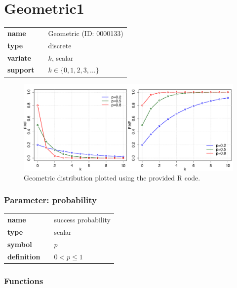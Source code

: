 \section*{Geometric1} 

  \bigskip 

\begin{tabular}{p{2cm}cl}
\textbf{name} & & Geometric (ID: 0000133)\\ 
 
\textbf{type} & & discrete \\ 

\textbf{variate} & & $k
$, scalar \\ 

\textbf{support} & & $k \in \{0,1,2,3,\dots\}$
\end{tabular}

\begin{figure}[ht!]
\centering
  \includegraphics[width=140mm]{pics/Geometric.pdf}
 \caption{Geometric distribution plotted using the provided R code.}
 \label{fig:Geometric}
\end{figure}

\subsubsection*{Parameter: probability}

\noindent\begin{tabular}{p{2cm}cl}
\textbf{name} & & success probability \\
\textbf{type} & & scalar \\
\textbf{symbol} & & $p$  \\
\textbf{definition} & & $0< p \leq 1$
\end{tabular}
\subsubsection*{Functions}

